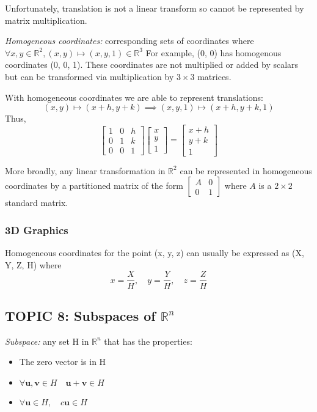 \documentclass[12pt]{article} %
\newcommand{\R}{\mathbb{R}}
\begin{document}
Unfortunately, translation is not a linear transform so cannot be represented by matrix multiplication. 

\emph{Homogeneous coordinates:} corresponding sets of coordinates where $\forall x, y \in \R^2, (x, y) \mapsto (x, y, 1) \in \R^3$
For example, (0, 0) has homogenous coordinates (0, 0, 1). These coordinates are not multiplied or added by scalars but can be transformed via multiplication by $3 \times 3$ matrices. 

With homogeneous coordinates we are able to represent translations:
$$(x, y) \mapsto (x + h, y + k) \implies (x, y, 1) \mapsto (x + h, y + k, 1)$$
Thus, 
$$\begin{bmatrix}
	1 & 0 & h\\
	0 & 1 & k\\
	0 & 0 & 1
\end{bmatrix} \begin{bmatrix}
	x\\
	y\\
	1
\end{bmatrix} = \begin{bmatrix}
	x + h\\
	y + k\\
	1
\end{bmatrix}$$

More broadly, any linear transformation in $\R^2$ can be represented in homogeneous coordinates by a partitioned matrix of the form $\begin{bmatrix}
	A & 0\\
	0 & 1
\end{bmatrix}$ where $A$ is a $2 \times 2$ standard matrix.

\subsubsection{3D Graphics}
Homogeneous coordinates for the point (x, y, z) can usually be expressed as (X, Y, Z, H) where 
$$x = \frac{X}{H}, \quad y = \frac{Y}{H}, \quad z = \frac{Z}{H}$$

\subsection{TOPIC 8: Subspaces of $\R^n$}
\emph{Subspace:} any set H in $\R^n$ that has the properties:
\begin{itemize}
	\item The zero vector is in H
	\item $\forall \mathbf{u}, \mathbf{v} \in H \quad \mathbf{u + v} \in H$
	\item $\forall \mathbf{u} \in H, \quad c\mathbf{u} \in H$
\end{itemize}
\end{document}

